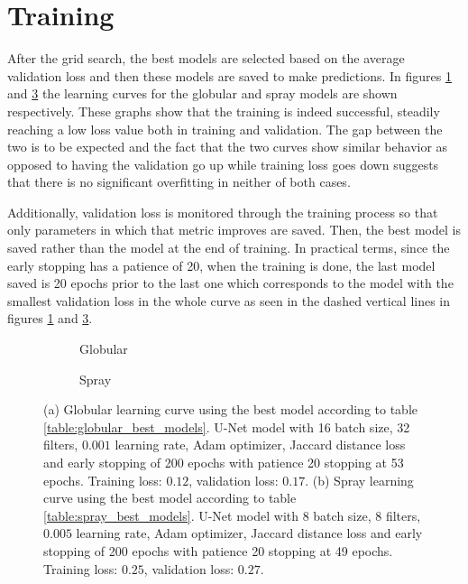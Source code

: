 

\section{Training}

After the grid search, the best models are selected based on the average validation loss and then these models are saved to make predictions. In figures \ref{fig:globular_loss_curve} and \ref{fig:spray_loss_curve} the learning curves for the globular and spray models are shown respectively. These graphs show that the training is indeed successful, steadily reaching a low loss value both in training and validation. The gap between the two is to be expected and the fact that the two curves show similar behavior as opposed to having the validation go up while training loss goes down suggests that there is no significant overfitting in neither of both cases.

Additionally, validation loss is monitored through the training process so that only parameters in which that metric improves are saved. Then, the best model is saved rather than the model at the end of training. In practical terms, since the early stopping has a patience of 20, when the training is done, the last model saved is 20 epochs prior to the last one which corresponds to the model with the smallest validation loss in the whole curve as seen in the dashed vertical lines in figures \ref{fig:globular_loss_curve} and \ref{fig:spray_loss_curve}.

\begin{figure}
  \begin{subfigure}[b]{\textwidth}
    
    \caption[Globular learning curve]{Globular}
    \label{fig:globular_loss_curve}
  \end{subfigure}
\vfill
  \begin{subfigure}[b]{\textwidth}
    
    \caption[Spray learning curve]{Spray}
    \label{fig:spray_loss_curve}
  \end{subfigure}
  \caption[Learning curves for globular (a) and spray (b) transfer]{(a) Globular learning curve using the best model according to table \ref{table:globular_best_models}. U-Net model with 16 batch size, 32 filters, $0.001$ learning rate, Adam optimizer, Jaccard distance loss and early stopping of 200 epochs with patience 20 stopping at 53 epochs. Training loss: $0.12$, validation loss: $0.17$. (b) Spray learning curve using the best model according to table \ref{table:spray_best_models}. U-Net model with 8 batch size, 8 filters, $0.005$ learning rate, Adam optimizer, Jaccard distance loss and early stopping of 200 epochs with patience 20 stopping at 49 epochs. Training loss: $0.25$, validation loss: $0.27$.} 
\end{figure}

